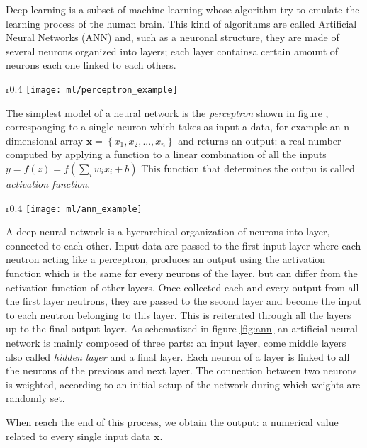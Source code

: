 \documentclass[a4paper,11pt]{article}
\begin{document}
Deep learning is a subset of machine learning whose algorithm try to emulate the learning process of the human brain.
This kind of algorithms are called Artificial Neural Networks (ANN) and, such as a neuronal structure, they are made of several neurons organized into layers; each layer containsa certain amount of neurons each one linked to each others.

\begin{wrapfigure}{r}{0.4\textwidth}
\centering
\texttt{[image: ml/perceptron\_example]}
\caption{Perceptron}
\label{fig:perceptron}
\end{wrapfigure}

The simplest model of a neural network is the \emph{perceptron} shown in figure , corresponging to a single neuron which takes as input a data, for example an n-dimensional array $\textbf{x} = \left\{ x_1, x_2, ..., x_n\right\}$ and returns an output: a real number computed by applying a function to a linear combination of all the inputs $ y = f(z) = f \left ( \sum_i w_{i} x_i + b \right )$
This function that determines the outpu is called \emph{activation function}.



\begin{wrapfigure}{r}{0.4\textwidth}
\centering
\texttt{[image: ml/ann\_example]}
\caption{Artificial Neural Network}
\label{fig:ann}
\end{wrapfigure}


A deep neural network is a hyerarchical organization of neurons into layer, connected to each other.
Input data are passed to the first input layer where each neutron acting like a perceptron, produces an output using the activation function which is the same for every neurons of the layer, but can differ from the activation function of other layers.
Once collected each and every output from all the first layer neutrons, they are passed to the second layer and become the input to each neutron belonging to this layer.
This is reiterated through all the layers up to the final output layer.
As schematized in figure \ref{fig:ann} an artificial neural network is mainly composed of three parts: an input layer, come middle layers also  called \emph{hidden layer} and a final layer. Each neuron of a layer is linked to all the neurons of the previous and next layer.
The connection between two neurons is weighted, according to an initial setup of the network during which weights are randomly set.

When reach the end of this process, we obtain the output: a numerical value related to every single input data $\textbf{x}$.
\end{document}
